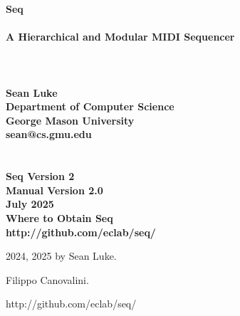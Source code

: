 \documentclass[twoside,10pt]{article}
\newcommand\booktitle{Seq\\~\vspace{0em}\\\LARGE A Hierarchical and Modular MIDI Sequencer\\}
\newcommand\reference[1]{\vspace{0.5em}\hfill{\parbox{6in}{\raggedleft\noindent\textsf{#1}}}}
\begin{document}

\noindent\huge\bf \booktitle\\
\\
\\
\Large\bf Sean Luke\\
{\large\rm 
Department of Computer Science\\
George Mason University\\
sean@cs.gmu.edu}\\
\\
\\
\large\rm {\bf Seq Version 2}\\
\large\rm {\bf Manual Version 2.0}\\
\large\rm  July 2025\\

\vspace{5in}
\noindent\Large\bf Where to Obtain Seq\\
\large\rm http:/\!/github.com/eclab/seq/

\clearpage

\small 
{}  2024, 2025 by Sean Luke.

\vspace{0.25in}
 Filippo Canovalini.

\vspace{0.25in}


\reference{http:/\!/github.com/eclab/seq/}

\vspace{0.15in}
\end{document}
